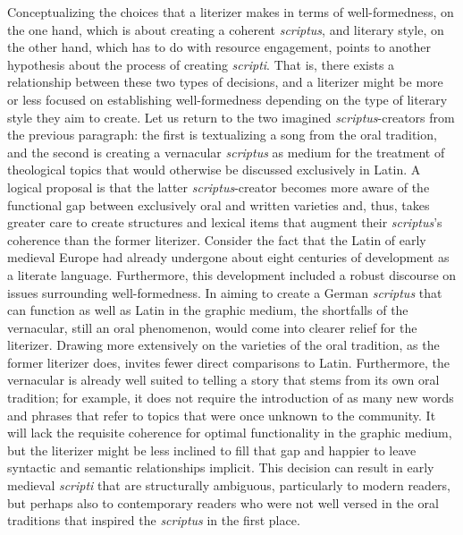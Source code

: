 Conceptualizing the choices that a literizer makes in terms of well-formedness, on the one hand, which is about creating a coherent \textit{scriptus}, and literary style, on the other hand, which has to do with resource engagement, points to another hypothesis about the process of creating \textit{scripti}. That is, there exists a relationship between these two types of decisions, and a literizer might be more or less focused on establishing well-formedness depending on the type of literary style they aim to create. Let us return to the two imagined \textit{scriptus}{}-creators from the previous paragraph: the first is textualizing a song from the oral tradition, and the second is creating a vernacular \textit{scriptus} as medium for the treatment of theological topics that would otherwise be discussed exclusively in Latin. A logical proposal is that the latter \textit{scriptus}{}-creator becomes more aware of the functional gap between exclusively oral and written varieties and, thus, takes greater care to create structures and lexical items that augment their \textit{scriptus}’s coherence than the former literizer. Consider the fact that the Latin of early medieval Europe had already undergone about eight centuries of development as a literate language. Furthermore, this development included a robust discourse on issues surrounding well-formedness. In aiming to create a German \textit{scriptus} that can function as well as Latin in the graphic medium, the shortfalls of the vernacular, still an oral phenomenon, would come into clearer relief for the literizer. Drawing more extensively on the varieties of the oral tradition, as the former literizer does, invites fewer direct comparisons to Latin. Furthermore, the vernacular is already well suited to telling a story that stems from its own oral tradition; for example, it does not require the introduction of as many new words and phrases that refer to topics that were once unknown to the community. It will lack the requisite coherence for optimal functionality in the graphic medium, but the literizer might be less inclined to fill that gap and happier to leave syntactic and semantic relationships implicit. This decision can result in early medieval \textit{scripti} that are structurally ambiguous, particularly to modern readers, but perhaps also to contemporary readers who were not well versed in the oral traditions that inspired the \textit{scriptus} in the first place. 

